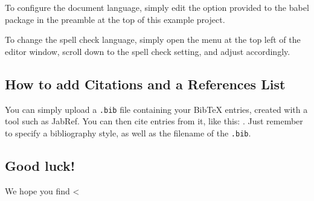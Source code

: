 \documentclass{article}
\begin{document}
To configure the document language, simply edit the option provided to the babel package in the preamble at the top of this example project.

To change the spell check language, simply open the menu at the top left of the editor window, scroll down to the spell check setting, and adjust accordingly.

\subsection{How to add Citations and a References List}

You can simply upload a \verb|.bib| file containing your BibTeX entries, created with a tool such as JabRef. You can then cite entries from it, like this: \cite{greenwade93}. Just remember to specify a bibliography style, as well as the filename of the \verb|.bib|.

\subsection{Good luck!}

We hope you find <%



\end{document}
